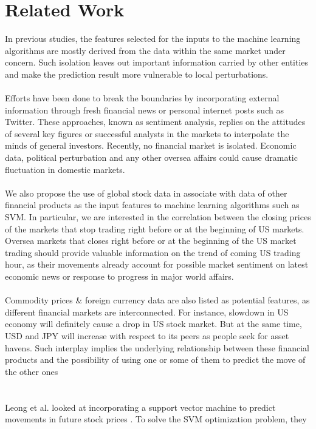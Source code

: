 \usepackage{fancyhdr}\documentclass[conference]{IEEEtran}
\begin{document}
\section{Related Work}
In previous studies, the features selected for the inputs to the machine learning algorithms are mostly derived from the data within the same market under concern. Such isolation leaves out important information carried by other entities and make the prediction result more vulnerable to local perturbations.\\ \\
   Efforts have been done to break the boundaries by incorporating external information through fresh financial news or personal internet posts such as Twitter. These approaches, known as sentiment analysis, replies on the attitudes of several key figures or successful analysts in the markets to interpolate the minds of general investors. Recently, no financial market is isolated. Economic data, political perturbation and any other oversea affairs could cause dramatic fluctuation in domestic markets.  \\  \\
   We also propose the use of global stock data in associate with data of other financial products as the input features to machine learning algorithms such as SVM. In particular, we are interested in the correlation between the closing prices of the markets that stop trading right before or at the beginning of US markets. Oversea markets that closes right before or at the beginning of the US market trading should provide valuable information on the trend of coming US trading hour, as their movements already account for possible market sentiment on latest economic news or response to progress in major world affairs. \\ \\
   Commodity prices & foreign currency data are also listed as potential features, as different financial markets are interconnected. For instance, slowdown in US economy will definitely cause a drop in US stock market. But at the same time, USD and JPY will increase with respect to its peers as people seek for asset havens. Such interplay implies the underlying relationship between these financial products and the possibility of using one or some of them to predict the move of the other ones\\
\\ \\
Leong et al. looked at incorporating a support vector
machine to predict movements in future stock prices \cite{1}. To solve the SVM optimization problem, they
\end{document}
